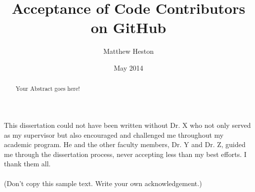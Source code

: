 \documentclass{iitthesis}
\begin{document}
\title{Acceptance of Code Contributors on GitHub}
\author{Matthew Heston}
\date{May 2014}
\maketitle                %


\prelimpages         %


\begin{acknowledgement}     %
\par  This dissertation could not have been written without Dr. X
who not only served as my supervisor but also encouraged and
challenged me throughout my academic program. He and the other
faculty members, Dr. Y and Dr. Z, guided me through the
dissertation process, never accepting less than my best efforts. I
thank them all.\\ \\ (Don't copy this sample text. Write your own
acknowledgement.)
\end{acknowledgement}


\tableofcontents
\clearpage

\listoftables

\clearpage

\listoffigures

\clearpage







\begin{abstract}           %
\par Your Abstract goes here!
\end{abstract}
\end{document}
